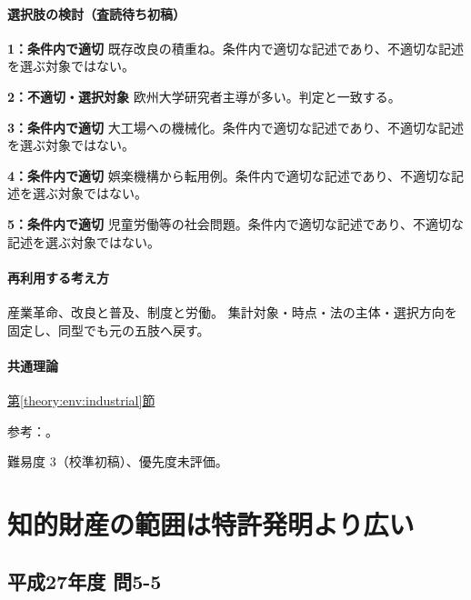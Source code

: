 \paragraph{選択肢の検討（査読待ち初稿）}\mbox{}\par

\noindent\textbf{1：条件内で適切} 既存改良の積重ね。条件内で適切な記述であり、不適切な記述を選ぶ対象ではない。\par

\noindent\textbf{2：不適切・選択対象} 欧州大学研究者主導が多い。判定と一致する。\par

\noindent\textbf{3：条件内で適切} 大工場への機械化。条件内で適切な記述であり、不適切な記述を選ぶ対象ではない。\par

\noindent\textbf{4：条件内で適切} 娯楽機構から転用例。条件内で適切な記述であり、不適切な記述を選ぶ対象ではない。\par

\noindent\textbf{5：条件内で適切} 児童労働等の社会問題。条件内で適切な記述であり、不適切な記述を選ぶ対象ではない。\par

\paragraph{再利用する考え方} 産業革命、改良と普及、制度と労働。 集計対象・時点・法の主体・選択方向を固定し、同型でも元の五肢へ戻す。

\paragraph{共通理論} \hyperref[theory:env:industrial]{第\ref*{theory:env:industrial}節}

\par 参考：\cite{env58_steam}。

\par 難易度 3（校準初稿）、優先度未評価。

\section{知的財産の範囲は特許発明より広い}

\subsection{平成27年度 問5-5}
\label{q:h27-reg-basic-5-5}

